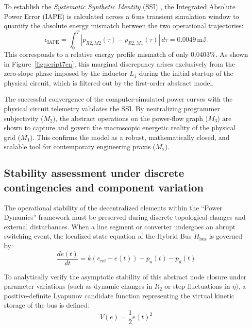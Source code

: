 \documentclass[energies,accept,oneauthor,pdftex]{Definitions/mdpi}
\begin{document}
To establish the \textit{Systematic Synthetic Identity} (SSI) \cite{bueno_sciences_2013}, the Integrated Absolute Power Error (IAPE) is calculated across a $6\,\text{ms}$ transient simulation window to quantify the absolute energy mismatch between the two operational trajectories:
\begin{equation}
    \epsilon_{\text{IAPE}} = \int_{0}^{T} |p_{R2, M2}(\tau) - p_{R2, M1}(\tau)| \, d\tau = 0.0049\,\text{mJ}.
\end{equation}
This corresponds to a relative energy profile mismatch of only $0.0403\%$. As shown in Figure~\ref{fig:script7en}, this marginal discrepancy arises exclusively from the zero-slope phase imposed by the inductor $L_1$ during the initial startup of the physical circuit, which is filtered out by the first-order abstract model.

The successful convergence of the computer-simulated power curves with the physical circuit telemetry validates the SSI. By neutralizing programmer subjectivity ($M_2$), the abstract operations on the power-flow graph ($M_3$) are shown to capture and govern the macroscopic energetic reality of the physical grid ($M_1$). This confirms the model as a robust, mathematically closed, and scalable tool for contemporary engineering praxis ($M_2$).

\subsection{Stability assessment under discrete contingencies and component variation}
The operational stability of the decentralized elements within the ``Power Dynamics'' framework must be preserved during discrete topological changes and external disturbances. When a line segment or converter undergoes an abrupt switching event, the localized state equation of the Hybrid Bus $H_{\text{bus}}$ is governed by:
\begin{equation}
    \frac{de(t)}{dt} = k(e_{\text{ref}} - e(t)) - p_u(t) - p_d(t)
\end{equation}

To analytically verify the asymptotic stability of this abstract node closure under parameter variations (such as dynamic changes in $R_2$ or step fluctuations in $\eta$), a positive-definite Lyapunov candidate function representing the virtual kinetic storage of the bus is defined:
\begin{equation}
    V(e) = \frac{1}{2} e(t)^2
\end{equation}
\end{document}
